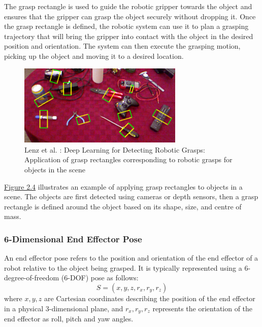 \documentclass[11pt, a4paper]{report}
\begin{document}
The grasp rectangle is used to guide the robotic gripper towards the object and ensures that the gripper can grasp the object securely without dropping it. Once the grasp rectangle is defined, the robotic system can use it to plan a grasping trajectory that will bring the gripper into contact with the object in the desired position and orientation. The system can then execute the grasping motion, picking up the object and moving it to a desired location.
\begin{figure}[H]
    \centering
    \includegraphics[width=0.7\textwidth]{docs/Project Report/Media/2_1_2_grasp_rectangle_application.png}
    \caption{Lenz et al. \cite{lenz2014deep}: Deep Learning for Detecting Robotic Grasps: Application of grasp rectangles corresponding to robotic grasps for objects in the scene}
    \label{fig:2.4}
\end{figure}
\hyperref[fig:2.4]{Figure 2.4} illustrates an example of applying grasp rectangles to objects in a scene. The objects are first detected using cameras or depth sensors, then a grasp rectangle is defined around the object based on its shape, size, and centre of mass.

\subsubsection{6-Dimensional End Effector Pose}\label{sec:2.1.2.2}
An end effector pose refers to the position and orientation of the end effector of a robot relative to the object being grasped. It is typically represented using a 6-degree-of-freedom (6-DOF) pose as follows:
\begin{equation}
    S=(x,y,z,r_x,r_y,r_z)
\end{equation}
where $x,y,z$ are Cartesian coordinates describing the position of the end effector in a physical 3-dimensional plane, and $r_x,r_y,r_z$ represents the orientation of the end effector as roll, pitch and yaw angles.
\end{document}
